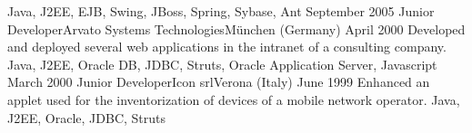 \begin{experiences}
                    {Java, J2EE, EJB, Swing, JBoss, Spring, Sybase, Ant}
  \emptySeparator
  \consultantexperience
  {September 2005}   {Junior Developer}{Arvato Systems Technologies}{München (Germany)}
  {April 2000}       {
                     	  Developed and deployed several web applications in the intranet of a consulting company.
                     }
                     {Java, J2EE, Oracle DB, JDBC, Struts, Oracle Application Server, Javascript}
  \emptySeparator
  \consultantexperience
  {March 2000}  	{Junior Developer}{Icon srl}{Verona (Italy)}
  {June 1999}   	{ 
  				 		Enhanced an applet used for the inventorization of devices of a mobile network operator.
  				 	}
                	{Java, J2EE, Oracle, JDBC, Struts} 
\end{experiences}

